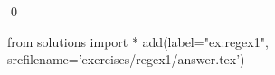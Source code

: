 
\begin{ex} 
  \label{ex:regex1}
  
  \qed
\end{ex} 
\begin{python0}
from solutions import *
add(label="ex:regex1",
    srcfilename='exercises/regex1/answer.tex') 
\end{python0}
